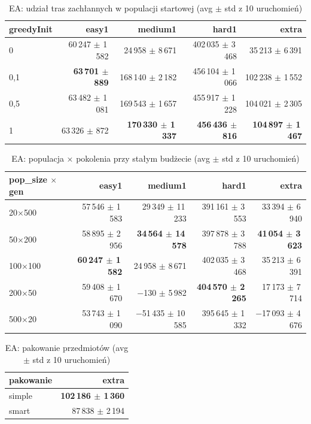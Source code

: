 \begin{table}[H]
  \centering
  \small
  \caption{EA: udział tras zachłannych w populacji startowej (avg $\pm$ std z 10 uruchomień)}
  \label{tab:ea-greedy-init}
  \begin{tabular}{lrrrr}
    \toprule
    greedyInit & easy1 & medium1 & hard1 & extra \\
    \midrule
    0 & 60\,247 $\pm$ 1\,582 & 24\,958 $\pm$ 8\,671 & 402\,035 $\pm$ 3\,468 & 35\,213 $\pm$ 6\,391 \\
    0{,}1 & \textbf{63\,701 $\pm$ 889} & 168\,140 $\pm$ 2\,182 & 456\,104 $\pm$ 1\,066 & 102\,238 $\pm$ 1\,552 \\
    0{,}5 & 63\,482 $\pm$ 1\,081 & 169\,543 $\pm$ 1\,657 & 455\,917 $\pm$ 1\,228 & 104\,021 $\pm$ 2\,305 \\
    1 & 63\,326 $\pm$ 872 & \textbf{170\,330 $\pm$ 1\,337} & \textbf{456\,436 $\pm$ 816} & \textbf{104\,897 $\pm$ 1\,467} \\
    \bottomrule
  \end{tabular}
\end{table}

\begin{table}[H]
  \centering
  \small
  \caption{EA: populacja × pokolenia przy stałym budżecie (avg $\pm$ std z 10 uruchomień)}
  \label{tab:ea-budget}
  \begin{tabular}{lrrrr}
    \toprule
    pop\_size $\times$ gen & easy1 & medium1 & hard1 & extra \\
    \midrule
    20$\times$500 & 57\,546 $\pm$ 1\,583 & 29\,349 $\pm$ 11\,233 & 391\,161 $\pm$ 3\,553 & 33\,394 $\pm$ 6\,940 \\
    50$\times$200 & 58\,895 $\pm$ 2\,956 & \textbf{34\,564 $\pm$ 14\,578} & 397\,878 $\pm$ 3\,788 & \textbf{41\,054 $\pm$ 3\,623} \\
    100$\times$100 & \textbf{60\,247 $\pm$ 1\,582} & 24\,958 $\pm$ 8\,671 & 402\,035 $\pm$ 3\,468 & 35\,213 $\pm$ 6\,391 \\
    200$\times$50 & 59\,408 $\pm$ 1\,670 & $-$130 $\pm$ 5\,982 & \textbf{404\,570 $\pm$ 2\,265} & 17\,173 $\pm$ 7\,714 \\
    500$\times$20 & 53\,743 $\pm$ 1\,090 & $-$51\,435 $\pm$ 10\,585 & 395\,645 $\pm$ 1\,332 & $-$17\,093 $\pm$ 4\,676 \\
    \bottomrule
  \end{tabular}
\end{table}

\begin{table}[H]
  \centering
  \small
  \caption{EA: pakowanie przedmiotów (avg $\pm$ std z 10 uruchomień)}
  \label{tab:ea-packing}
  \begin{tabular}{lr}
    \toprule
    pakowanie & extra \\
    \midrule
    simple & \textbf{102\,186 $\pm$ 1\,360} \\
    smart & 87\,838 $\pm$ 2\,194 \\
    \bottomrule
  \end{tabular}
\end{table}

